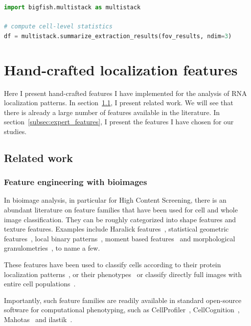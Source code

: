 \begin{minipage}{0.9\textwidth}
\begin{lstlisting}[language=Python]
import bigfish.multistack as multistack

# compute cell-level statistics
df = multistack.summarize_extraction_results(fov_results, ndim=3)
\end{lstlisting}
\end{minipage}

\section{Hand-crafted localization features}
\label{sec:hand_features}

Here I present hand-crafted features I have implemented for the analysis of \ac{RNA} localization patterns.
In section~\ref{subsec:related_work_hand_features}, I present related work.
We will see that there is already a large number of features available in the literature.
In section~\ref{subsec:expert_features}, I present the features I have chosen for our studies.

\subsection{Related work}
\label{subsec:related_work_hand_features}

\subsubsection{Feature engineering with bioimages}

In bioimage analysis, in particular for High Content Screening, there is an abundant literature on feature families that have been used for cell and whole image classification.
They can be roughly categorized into shape features and texture features.
Examples include Haralick features~\cite{Haralick1973}, statistical geometric features~\cite{Walker1996}, local binary patterns~\cite{ahonen_2006}, moment based features~\cite{Reeve1992} and morphological granulometries~\cite{Serra1983}, to name a few.

These features have been used to classify cells according to their protein localization patterns~\cite{boland_automated_1998, Glory2007}, or their phenotypes~\cite{Wang2008, Jones2009, Walter2010} or classify directly full images with entire cell populations~\cite{Uhlmann2016}.

Importantly, such feature families are readily available in standard open-source software for computational phenotyping, such as CellProfiler~\cite{Carpenter2006, Jones2008, mcquin_cellprofiler_2018}, CellCognition~\cite{held_cellcognition_2010}, Mahotas~\cite{mahotas_2013} and ilastik~\cite{berg_ilastik_2019}.

